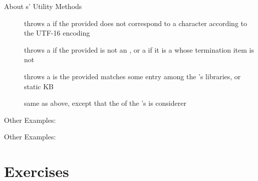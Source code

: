 \documentclass[presentation]{beamer}\mode<presentation>{\usetheme{AMSBolognaFC}}
\begin{document}
\begin{frame}[allowframebreaks]{About s' Utility Methods}
\begin{description}
        \item[] throws a  if the provided  does not correspond to a character according to the UTF-16 encoding
        \item[] throws a  if the provided  is not an , or a  if it is a  whose termination item is not \pl{[]}
        \item[] throws a  is the provided  matches some entry among the 's libraries, or static KB
        \item[] same as above, except that the  of the 's  is considerer
    \end{description}
\end{frame}

\begin{frame}{Other Examples: }
\end{frame}

\begin{frame}{Other Examples: }
\end{frame}

\section{Exercises}
\end{document}

